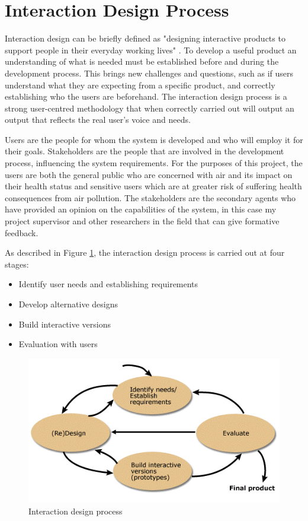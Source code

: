 \section{Interaction Design Process}
Interaction design can be briefly defined as "designing interactive products to support people in their everyday working lives" \cite{Sharp2011}. To develop a useful product an understanding of what is needed must be established before and during the development process. This brings new challenges and questions, such as if users understand what they are expecting from a specific product, and correctly establishing who the users are beforehand. The interaction design process is a strong user-centred methodology that when correctly carried out will output an output that reflects the real user's voice and needs. 

Users are the people for whom the system is developed and who will employ it for their goals. Stakeholders are the people that are involved in the development process, influencing the system requirements. For the purposes of this project, the users are both the general public who are concerned with air and its impact on their health status and sensitive users which are at greater risk of suffering health consequences from air pollution. The stakeholders are the secondary agents who have provided an opinion on the capabilities of the system, in this case my project supervisor and other researchers in the field that can give formative feedback.

As described in Figure \ref{fig:interaction_design}, the interaction design process is carried out at four stages: \begin{itemize}
  \item Identify user needs and establishing requirements
  \item Develop alternative designs
  \item Build interactive versions
  \item Evaluation with users
\end{itemize}

\begin{figure}[h]
  \includegraphics[scale=.8]{images/interatcion-design.png}
  \caption[Interaction design process]{Interaction design process \cite{Sharp2011}}
  \label{fig:interaction_design}
\end{figure}

